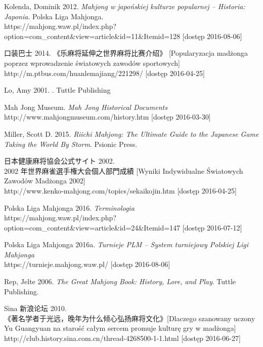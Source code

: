 Kolenda, Dominik 2012. \textit{Mahjong w japońskiej kulturze popularnej --
Historia: Japonia}. Polska Liga Mahjonga.
\\https://mahjong.waw.pl/index.php?option=com\_content\&view=article\&id=11\&Itemid=128
[dostęp 2016-08-06]

 口装巴士 2014.  《乐麻将延伸之世界麻将比赛介绍》
[Popularyzacja madżonga poprzez wprowadzenie światowych zawodów
sportowych] \\http://m.ptbus.com/huanlemajiang/221298/ [dostęp 2016-04-25]

Lo, Amy 2001. . Tuttle
Publishing

Mah Jong Museum. \textit{Mah Jong Historical Documents}
\\http://www.mahjongmuseum.com/history.htm [dostęp
2016-03-30]

Miller, Scott D. 2015. \textit{Riichi Mahjong: The Ultimate Guide to the
Japanese Game Taking the World By Storm}. Psionic Press.

 日本健康麻将協会公式サイト  2002.
\\ 2002
年世界麻雀選手権大会個人部門成績 [Wyniki Indywidualne Światowych Zawodów Madżonga 2002]
\\http://www.kenko-mahjong.com/topics/sekaikojin.htm [dostęp 2016-04-25]

Polska Liga Mahjonga 2016. \textit{Terminologia}
\\
https://mahjong.waw.pl/index.php?option=com\_content\&view=article\&id=24\&Itemid=147
[dostęp 2016-07-12]

Polska Liga Mahjonga 2016a. \textit{Turnieje PLM -- System turniejowy Polskiej
Ligi Mahjonga} \\https://turnieje.mahjong.waw.pl/ [dostęp 2016-08-06]

Rep, Jelte 2006. \textit{The Great Mahjong Book: History, Lore, and Play}.
Tuttle Publishing. %

Sina  新浪论坛 2010.  \\
《著名学者于光远，晚年为什么倾心弘扬麻将文化》[Dlaczego szanowany uczony Yu Guangyuan na
starość całym sercem promuje kulturę gry w madżonga]
\\http://club.history.sina.com.cn/thread-4268500-1-1.html [dostęp 2016-06-27]

